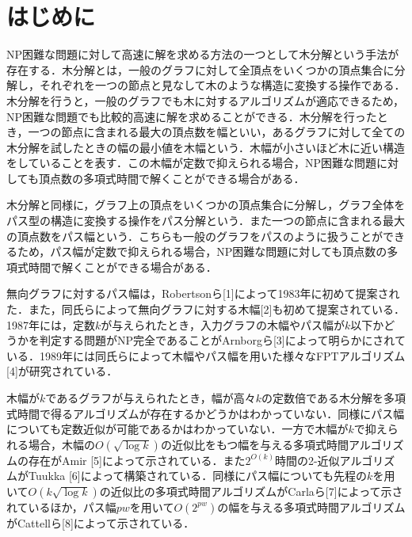 \documentclass[master]{kuisthesis}		%
\theoremstyle{plain}
\theoremstyle{definition}
\begin{document}
\tableofcontents				%
















\section{はじめに}\label{sec-intro}		%

NP困難な問題に対して高速に解を求める方法の一つとして木分解という手法が存在する．木分解とは，一般のグラフに対して全頂点をいくつかの頂点集合に分解し，それぞれを一つの節点と見なして木のような構造に変換する操作である．木分解を行うと，一般のグラフでも木に対するアルゴリズムが適応できるため，NP困難な問題でも比較的高速に解を求めることができる．木分解を行ったとき，一つの節点に含まれる最大の頂点数を幅といい，あるグラフに対して全ての木分解を試したときの幅の最小値を木幅という．木幅が小さいほど木に近い構造をしていることを表す．この木幅が定数で抑えられる場合，NP困難な問題に対しても頂点数の多項式時間で解くことができる場合がある．

木分解と同様に，グラフ上の頂点をいくつかの頂点集合に分解し，グラフ全体をパス型の構造に変換する操作をパス分解という．また一つの節点に含まれる最大の頂点数をパス幅という．こちらも一般のグラフをパスのように扱うことができるため，パス幅が定数で抑えられる場合，NP困難な問題に対しても頂点数の多項式時間で解くことができる場合がある．


無向グラフに対するパス幅は，Robertsonら[1]によって1983年に初めて提案された．また，同氏らによって無向グラフに対する木幅[2]も初めて提案されている．1987年には，定数$k$が与えられたとき，入力グラフの木幅やパス幅が$k$以下かどうかを判定する問題がNP完全であることがArnborgら[3]によって明らかにされている．1989年には同氏らによって木幅やパス幅を用いた様々なFPTアルゴリズム[4]が研究されている．

木幅が$k$であるグラフが与えられたとき，幅が高々$k$の定数倍である木分解を多項式時間で得るアルゴリズムが存在するかどうかはわかっていない．同様にパス幅についても定数近似が可能であるかはわかっていない．一方で木幅が$k$で抑えられる場合，木幅の$O(\sqrt{\log k})$の近似比をもつ幅を与える多項式時間アルゴリズムの存在がAmir [5]によって示されている．また$2^{O(k)}$時間の2-近似アルゴリズムがTuukka [6]によって構築されている．同様にパス幅についても先程の$k$を用いて$O(k\sqrt{\log k})$の近似比の多項式時間アルゴリズムがCarlaら[7]によって示されているほか，パス幅$pw$を用いて$O(2^{pw})$の幅を与える多項式時間アルゴリズムがCattellら[8]によって示されている．
\end{document}
